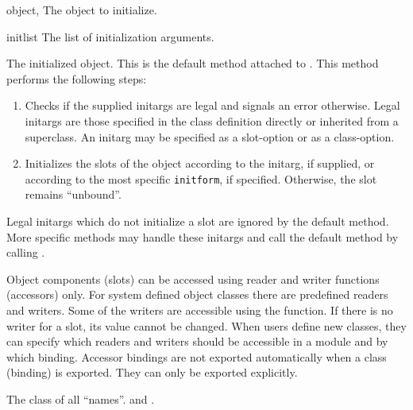 \begin{optDefinition}
%
\begin{specargs}
    \item[object, \classref{object}] The object to initialize.
    \item[initlist] The list of initialization arguments.
\end{specargs}
%
\result%
The initialized object.
%
\remarks%
This is the default method attached to .  This method
performs the following steps:

\begin{enumerate}
    \item Checks if the supplied initargs are legal and signals an error
    otherwise. Legal initargs are those specified in the class definition
    directly or inherited from a superclass.  An initarg may be specified as a
    slot-option or as a class-option.

    \item Initializes the slots of the object according to the initarg, if
    supplied, or according to the most specific {\tt initform}, if specified.
    Otherwise, the slot remains ``unbound''.
\end{enumerate}
%
Legal initargs which do not initialize a slot are ignored by the default
 method.  More specific methods may handle these initargs
and call the default method by calling .
%
%
\end{optDefinition}

%
\begin{optDefinition}
Object components (slots) can be accessed using reader and writer functions
(accessors) only. For system defined object classes there are predefined readers
and writers. Some of the writers are accessible using the 
function. If there is no writer for a slot, its value cannot be changed. When
users define new classes, they can specify which readers and writers should be
accessible in a module and by which binding.  Accessor bindings are not exported
automatically when a class (binding) is exported. They can only be exported
explicitly.

%
%
The class of all ``names''.
%
\seealso%
 and .
%
\end{optDefinition}
